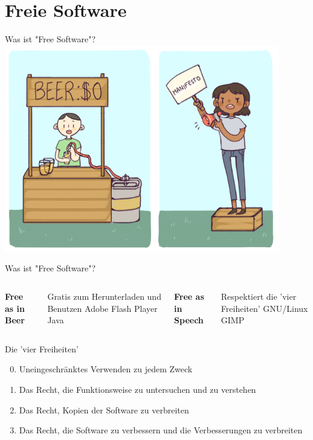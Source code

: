 \documentclass[10pt]{beamer}
\begin{document}
\section{Freie Software}

\begin{frame}{Was ist "Free Software"?}
    \centering
    \includegraphics[keepaspectratio,width=0.9\textwidth]{img/freesoftware.png}
\end{frame}

\begin{frame}{Was ist "Free Software"?}
    \begin{columns}[T,onlytextwidth]
            \textbf{Free as in Beer}
            \begin{outline}
                \1 Gratis zum Herunterladen und Benutzen
                    \2 Adobe Flash Player
                    \2 Java
            \end{outline}
            \textbf{Free as in Speech}
            \begin{outline}
                \1 Respektiert die 'vier Freiheiten'
                    \2 GNU/Linux
                    \2 GIMP
            \end{outline}
    \end{columns}
\end{frame}

\begin{frame}{Die 'vier Freiheiten'}
    \begin{enumerate}
        \setcounter{enumi}{-1}
        \item Uneingeschränktes Verwenden zu jedem Zweck
        \item Das Recht, die Funktionsweise zu untersuchen und zu verstehen
        \item Das Recht, Kopien der Software zu verbreiten
        \item Das Recht, die Software zu verbessern und die Verbesserungen zu verbreiten
    \end{enumerate}
\end{frame}
\end{document}
